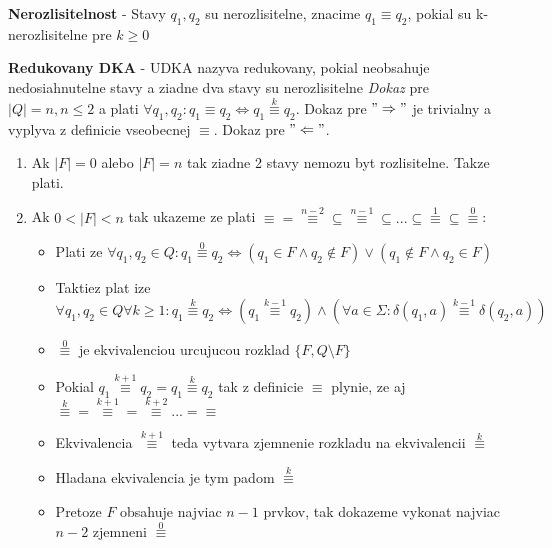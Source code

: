 \documentclass[12pt]{article}
\begin{document}
\textbf{Nerozlisitelnost} - Stavy $q_{1}, q_{2}$ su nerozlisitelne, znacime $q_{1} \equiv q_{2}$, pokial su
k-nerozlisitelne pre $k \ge 0$

\textbf{Redukovany DKA} - UDKA nazyva redukovany, pokial neobsahuje nedosiahnutelne stavy a ziadne
dva stavy su nerozlisitelne
\emph{Dokaz} pre $|Q| = n, n \le 2$ a plati $\forall q_{1},q_{2}: q_{1} \equiv q_{2} \Leftrightarrow q_{1} \overset{k}{\equiv} q_{2}$.
Dokaz pre $"\Rightarrow"$ je trivialny a vyplyva z definicie vseobecnej $\equiv$. Dokaz pre $"\Leftarrow"$.
\begin{enumerate}
	\item Ak $|F| = 0$ alebo $|F| = n$ tak ziadne 2 stavy nemozu byt rozlisitelne. Takze plati.
	\item Ak $0 < |F| < n$ tak ukazeme ze plati $\equiv = \overset{n-2}{\equiv} \subseteq \overset{n-1}{\equiv}
		\subseteq ... \subseteq \overset{1}{\equiv} \subseteq \overset{0}{\equiv}$:
		\begin{itemize}
			\item Plati ze $\forall q_{1}, q_{2} \in Q: q_{1} \overset{0}{\equiv} q_{2} \Leftrightarrow
				(q_{1} \in F \land q_{2} \not\in F) \lor (q_{1} \not\in F \land q_{2} \in F)$
			\item Taktiez plat ize $\forall q_{1}, q_{2} \in Q \forall k \ge 1: q_{1} \overset{k}{\equiv} q_{2} \Leftrightarrow
				(q_{1} \overset{k-1}{\equiv} q_{2}) \land (\forall a \in \Sigma: \delta(q_{1}, a) \overset{k-1}{\equiv} \delta(q_{2}, a))$
			\item $\overset{0}{\equiv}$ je ekvivalenciou urcujucou rozklad $\{F, Q\setminus F\}$
			\item Pokial $q_{1} \overset{k+1}{\equiv} q_{2} = q_{1} \overset{k}{\equiv} q_{2}$ tak z definicie $\equiv$ plynie, ze
				aj $\overset{k}{\equiv} = \overset{k+1}{\equiv} = \overset{k+2}{\equiv} ... = \equiv$
			\item Ekvivalencia $\overset{k+1}{\equiv}$ teda vytvara zjemnenie rozkladu na ekvivalencii $\overset{k}{\equiv}$
			\item Hladana ekvivalencia je tym padom $\overset{k}{\equiv}$
			\item Pretoze $F$ obsahuje najviac $n - 1$ prvkov, tak dokazeme vykonat najviac $n - 2$ zjemneni $\overset{0}{\equiv}$
		\end{itemize}
\end{enumerate}
\end{document}
